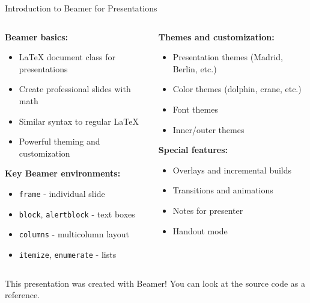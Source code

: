 	\begin{frame}{Introduction to Beamer for Presentations}
		\begin{columns}
			\begin{column}{0.5\textwidth}
				\textbf{Beamer basics:}
				\begin{itemize}
					\item LaTeX document class for presentations
					\item Create professional slides with math
					\item Similar syntax to regular LaTeX
					\item Powerful theming and customization
				\end{itemize}
				
				\textbf{Key Beamer environments:}
				\begin{itemize}
					\item \texttt{frame} - individual slide
					\item \texttt{block}, \texttt{alertblock} - text boxes
					\item \texttt{columns} - multicolumn layout
					\item \texttt{itemize}, \texttt{enumerate} - lists
				\end{itemize}
			\end{column}
			
			\begin{column}{0.5\textwidth}
				\textbf{Themes and customization:}
				\begin{itemize}
					\item Presentation themes (Madrid, Berlin, etc.)
					\item Color themes (dolphin, crane, etc.)
					\item Font themes
					\item Inner/outer themes
				\end{itemize}
				
				\textbf{Special features:}
				\begin{itemize}
					\item Overlays and incremental builds
					\item Transitions and animations
					\item Notes for presenter
					\item Handout mode
				\end{itemize}
			\end{column}
		\end{columns}
		
		\begin{tip}
			This presentation was created with Beamer! You can look at the source code as a reference.
		\end{tip}
	\end{frame}
	
